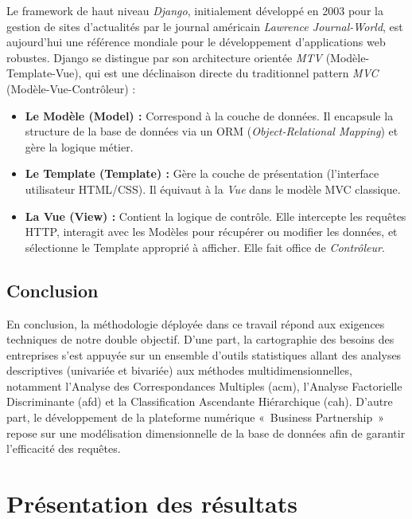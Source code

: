 \documentclass[12pt, a4paper, oneside]{report}
\begin{document}
Le framework de haut niveau \textit{Django}, initialement développé en 2003 pour la gestion de sites d'actualités par le journal américain \textit{Lawrence Journal-World}, est aujourd'hui une référence mondiale pour le développement d'applications web robustes. Django se distingue par son architecture orientée \textit{MTV} (Modèle-Template-Vue), qui est une déclinaison directe du traditionnel pattern \textit{MVC} (Modèle-Vue-Contrôleur) :
\begin{itemize}
	\item \textbf{Le Modèle (Model) :} Correspond à la couche de données. Il encapsule la structure de la base de données via un ORM (\textit{Object-Relational Mapping}) et gère la logique métier.
	\item \textbf{Le Template (Template) :} Gère la couche de présentation (l'interface utilisateur HTML/CSS). Il équivaut à la \textit{Vue} dans le modèle MVC classique.
	\item \textbf{La Vue (View) :} Contient la logique de contrôle. Elle intercepte les requêtes HTTP, interagit avec les Modèles pour récupérer ou modifier les données, et sélectionne le Template approprié à afficher. Elle fait office de \textit{Contrôleur}.
\end{itemize}
	
	\section*{Conclusion}
	En conclusion, la méthodologie déployée dans ce travail répond aux exigences techniques de notre double objectif. D'une part, la cartographie des besoins des entreprises s'est appuyée sur un ensemble d'outils statistiques allant des analyses descriptives (univariée et bivariée) aux méthodes multidimensionnelles, notamment l'Analyse des Correspondances Multiples (\gls{acm}), l'Analyse Factorielle Discriminante (\gls{afd}) et la Classification Ascendante Hiérarchique (\gls{cah}). D'autre part, le développement de la plateforme numérique «~Business Partnership~» repose sur une modélisation dimensionnelle de la base de données afin de garantir l'efficacité des requêtes.
	\chapter{Présentation des résultats}
	
\end{document}
